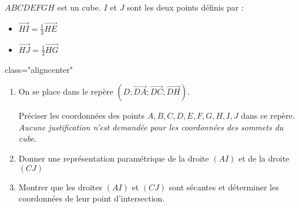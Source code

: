 
%
$ABCDEFGH$ est un cube. $I$ et $J$ sont les deux points définis par :
\begin{itemize}
     \item
     $\overrightarrow{HI}=\frac{1}{3}\overrightarrow{HE}$
     \item
     $\overrightarrow{HJ}=\frac{1}{3}\overrightarrow{HG}$
\end{itemize}

\begin{center}
\end{center}
class="aligncenter"
\begin{enumerate}
     \item
     On se place dans le repère $\left(D; \overrightarrow{DA}; \overrightarrow{DC}; \overrightarrow{DH}\right)$.
     \par
     Préciser les coordonnées des points $A, B, C, D, E, F, G, H, I, J$ dans ce repère.
     \textit{Aucune justification n'est demandée pour les coordonnées des sommets du cube.}
     \item
     Donner une représentation paramétrique de la droite $\left(AI\right)$ et de la droite $\left(CJ\right)$
     \item
     Montrer que les droites $\left(AI\right)$ et $\left(CJ\right)$ sont sécantes et déterminer les coordonnées de leur point d'intersection.
\end{enumerate}
